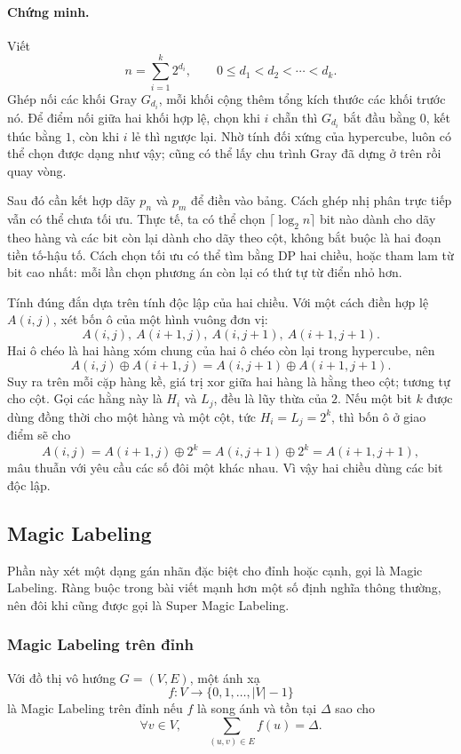 \documentclass[11pt]{article}
\begin{document}
\paragraph{Chứng minh.}
Viết
\[
  n=\sum_{i=1}^k 2^{d_i},\qquad 0\le d_1<d_2<\cdots<d_k.
\]
Ghép nối các khối Gray \(G_{d_i}\), mỗi khối cộng thêm tổng kích thước các
khối trước nó. Để điểm nối giữa hai khối hợp lệ, chọn khi \(i\) chẵn thì
\(G_{d_i}\) bắt đầu bằng \(0\), kết thúc bằng \(1\), còn khi \(i\) lẻ thì
ngược lại. Nhờ tính đối xứng của hypercube, luôn có thể chọn được dạng như
vậy; cũng có thể lấy chu trình Gray đã dựng ở trên rồi quay vòng.

Sau đó cần kết hợp dãy \(p_n\) và \(p_m\) để điền vào bảng. Cách ghép nhị phân
trực tiếp vẫn có thể chưa tối ưu. Thực tế, ta có thể chọn \(\lceil\log_2 n\rceil\)
bit nào dành cho dãy theo hàng và các bit còn lại dành cho dãy theo cột, không
bắt buộc là hai đoạn tiền tố-hậu tố. Cách chọn tối ưu có thể tìm bằng DP hai
chiều, hoặc tham lam từ bit cao nhất: mỗi lần chọn phương án còn lại có thứ tự
từ điển nhỏ hơn.

Tính đúng đắn dựa trên tính độc lập của hai chiều. Với một cách điền hợp lệ
\(A(i,j)\), xét bốn ô của một hình vuông đơn vị:
\[
  A(i,j),\ A(i+1,j),\ A(i,j+1),\ A(i+1,j+1).
\]
Hai ô chéo là hai hàng xóm chung của hai ô chéo còn lại trong hypercube, nên
\[
  A(i,j)\oplus A(i+1,j)=A(i,j+1)\oplus A(i+1,j+1).
\]
Suy ra trên mỗi cặp hàng kề, giá trị xor giữa hai hàng là hằng theo cột; tương
tự cho cột. Gọi các hằng này là \(H_i\) và \(L_j\), đều là lũy thừa của \(2\).
Nếu một bit \(k\) được dùng đồng thời cho một hàng và một cột, tức
\(H_i=L_j=2^k\), thì bốn ô ở giao điểm sẽ cho
\[
  A(i,j)=A(i+1,j)\oplus 2^k=A(i,j+1)\oplus 2^k=A(i+1,j+1),
\]
mâu thuẫn với yêu cầu các số đôi một khác nhau. Vì vậy hai chiều dùng các bit
độc lập.

\subsection{Magic Labeling}

Phần này xét một dạng gán nhãn đặc biệt cho đỉnh hoặc cạnh, gọi là Magic
Labeling. Ràng buộc trong bài viết mạnh hơn một số định nghĩa thông thường,
nên đôi khi cũng được gọi là Super Magic Labeling.

\subsubsection{Magic Labeling trên đỉnh}

Với đồ thị vô hướng \(G=(V,E)\), một ánh xạ
\[
  f:V\to \{0,1,\ldots,|V|-1\}
\]
là Magic Labeling trên đỉnh nếu \(f\) là song ánh và tồn tại \(\Delta\) sao cho
\[
  \forall v\in V,\qquad \sum_{(u,v)\in E} f(u)=\Delta.
\]
\end{document}
